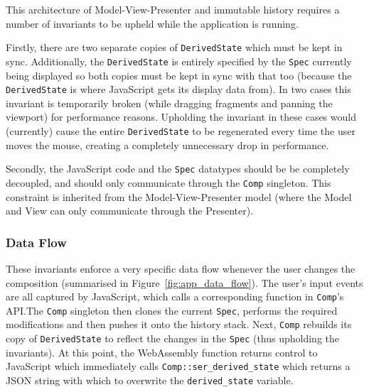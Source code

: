\documentclass[12pt]{article}
\begin{document}
This architecture of Model-View-Presenter and immutable history requires a number of invariants to
be upheld while the application is running.

Firstly, there are two separate copies of \verb|DerivedState| which must be kept in sync.
Additionally, the \verb|DerivedState| is entirely specified by the \verb|Spec| currently being
displayed so both copies must be kept in sync with that too (because the \verb|DerivedState| is
where JavaScript gets its display data from).  In two cases this invariant is temporarily broken
(while dragging fragments and panning the viewport) for performance reasons.  Upholding the
invariant in these cases would (currently) cause the entire \verb|DerivedState| to be regenerated
every time the user moves the mouse, creating a completely unnecessary drop in performance.

Secondly, the JavaScript code and the \verb|Spec| datatypes should be be completely decoupled, and
should only communicate through the \verb|Comp| singleton.  This constraint is inherited from the
Model-View-Presenter model (where the Model and View can only communicate through the Presenter).

\subsubsection{Data Flow}

These invariants enforce a very specific data flow whenever the user changes the composition
(summarised in Figure~\ref{fig:app_data_flow}).  The user's input events are all captured by
JavaScript, which calls a corresponding function in \verb|Comp|'s API.\@ The \verb|Comp| singleton
then clones the current \verb|Spec|, performs the required modifications and then pushes it onto the
history stack.  Next, \verb|Comp| rebuilds its copy of \verb|DerivedState| to reflect the changes in
the \verb|Spec| (thus upholding the invariants).  At this point, the WebAssembly function returns
control to JavaScript which immediately calls \verb|Comp::ser_derived_state| which returns a JSON
string with which to overwrite the \verb|derived_state| variable.
\end{document}
